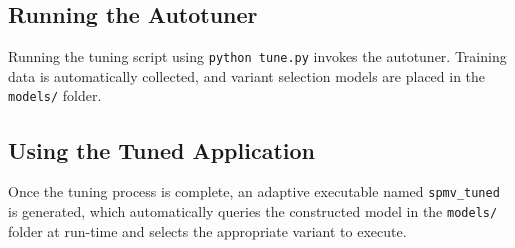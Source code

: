 \documentclass[12pt]{article}
\begin{document}
\subsection{Running the Autotuner}

Running the tuning script using \texttt{python tune.py} invokes the autotuner. Training data is automatically
collected, and variant selection models are placed in the \texttt{models/} folder.

\subsection{Using the Tuned Application}

Once the tuning process is complete, an adaptive executable named \texttt{spmv\_tuned} is generated, which
automatically queries the constructed model in the \texttt{models/} folder at run-time and selects
the appropriate variant to execute.
\end{document}
